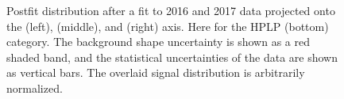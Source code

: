 \begin{figure}[h!]
\caption{Postfit distribution after a fit to 2016 and 2017 data projected onto the \MJO (left), \MJT (middle), and \MVV (right) axis. Here for the HPLP (bottom) category. The background shape uncertainty is shown as a red shaded band, and the statistical uncertainties of the data are shown as vertical bars. The overlaid signal distribution is arbitrarily normalized.}
\label{fig:searchIII:finalPostFitLP}
\end{figure}
\clearpage
